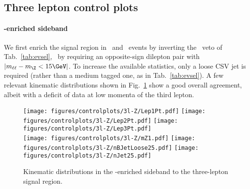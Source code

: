\subsection{Three lepton control plots}
\paragraph{\Z-enriched sideband}
We first enrich the signal region in \WZ\ and \ttZ\ events by inverting the \Z\ veto of Tab.~\ref{tab:evsel}, \ie\ by requiring an opposite-sign dilepton pair with $|m_{\ell\ell}-m_\Z < 15\GeV|$.
To increase the available statistics, only a loose CSV jet is required (rather than a medium tagged one, as in Tab.~\ref{tab:evsel}).
A few relevant kinematic distributions shown in Fig.~\ref{fig:3lzcontrol} show a good overall agreement, albeit with a deficit of data at low momenta of the third lepton.
\begin{figure} [!h]
  \centering
  \texttt{[image: figures/controlplots/3l-Z/Lep1Pt.pdf]}
  \texttt{[image: figures/controlplots/3l-Z/Lep2Pt.pdf]}
  \texttt{[image: figures/controlplots/3l-Z/Lep3Pt.pdf]} \\
  \texttt{[image: figures/controlplots/3l-Z/mZ1.pdf]}
  \texttt{[image: figures/controlplots/3l-Z/nBJetLoose25.pdf]}
  \texttt{[image: figures/controlplots/3l-Z/nJet25.pdf]} 
\caption{Kinematic distributions in the \Z-enriched sideband to the three-lepton signal region.}
\label{fig:3lzcontrol}
\end{figure}


